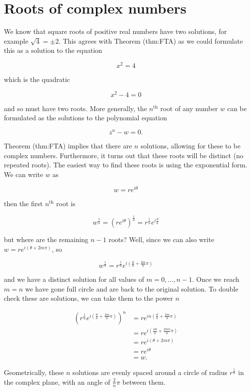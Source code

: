 \documentclass[
]{book}
\theoremstyle{definition}
\theoremstyle{definition}
\theoremstyle{definition}
\theoremstyle{definition}
\theoremstyle{remark}
\begin{document}
\hypertarget{roots-of-complex-numbers}{%
\section{Roots of complex numbers}\label{roots-of-complex-numbers}}

We know that square roots of positive real numbers have two solutions, for example \(\sqrt{4}=\pm 2\). This agrees with Theorem (thm:FTA) as we could formulate this as a solution to the equation

\[x^2=4\]

which is the quadratic

\[x^2-4=0\]

and so must have two roots. More generally, the \(n^\text{th}\) root of any number \(w\) can be formulated as the solutions to the polynomial equation

\[z^n-w=0.\]

Theorem (thm:FTA) implies that there are \(n\) solutions, allowing for these to be complex numbers. Furthermore, it turns out that these roots will be distinct (no repeated roots). The easiest way to find these roots is using the exponential form. We can write \(w\) as

\[w=re^{i\theta}\]

then the first \(n^\text{th}\) root is

\[w^{\frac{1}{n}}=(re^{i\theta})^\frac{1}{n}=r^\frac{1}{n}e^{i\frac{\theta}{n}}\]

but where are the remaining \(n-1\) roots? Well, since we can also write \(w=re^{i(\theta+2m\pi)}\), so

\[w^{\frac{1}{n}}=r^{\frac{1}{n}}e^{i(\frac{\theta}{n}+\frac{2m}{n}\pi)}\]

and we have a distinct solution for all values of \(m=0,\dotsc,n-1\). Once we reach \(m=n\) we have gone full circle and are back to the original solution. To double check these are solutions, we can take them to the power \(n\)

\begin{align*}
(r^{\frac{1}{n}}e^{i(\frac{\theta}{n}+\frac{2m}{n}\pi)})^n&=re^{in(\frac{\theta}{n}+\frac{2m}{n}\pi)}\\
&=re^{i(\frac{n\theta}{n}+\frac{2mn}{n}\pi)}\\
&=re^{i(\theta+2m\pi)}\\
&=re^{i\theta}\\
&=w.
\end{align*}

Geometrically, these \(n\) solutions are evenly spaced around a circle of radius \(r^{\frac{1}{n}}\) in the complex plane, with an angle of \(\frac{2}{n}\pi\) between them.
\end{document}
